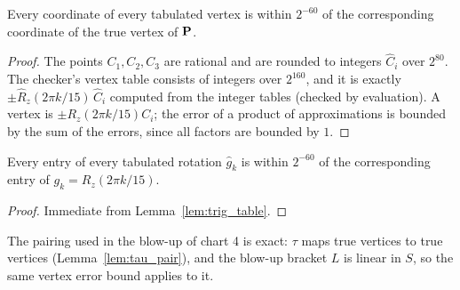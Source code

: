 \begin{lemma}
\label{lem:vertex_approx}
\leanok
{}
Every coordinate of every tabulated vertex is within $2^{-60}$ of the corresponding
coordinate of the true vertex of $\operatorname{\mathbf{P}}$.
\end{lemma}
\begin{proof}
\leanok
The points $C_1, C_2, C_3$ are rational and are rounded to integers $\hat C_i$ over $2^{80}$.
The checker's vertex table consists of integers over $2^{160}$, and it is exactly
$\pm \hat R_z(2\pi k/15)\, \hat C_i$ computed from the integer tables (checked by
evaluation). A vertex is $\pm R_z(2\pi k/15) C_i$; the error of a product of approximations
is bounded by the sum of the errors, since all factors are bounded by $1$.
\end{proof}

\begin{lemma}
\label{lem:group_approx}
\leanok
{}
Every entry of every tabulated rotation $\hat g_k$ is within $2^{-60}$ of the
corresponding entry of $g_k = R_z(2\pi k/15)$.
\end{lemma}
\begin{proof}
\leanok
Immediate from Lemma~\ref{lem:trig_table}.
\end{proof}

The pairing used in the blow-up of chart 4 is exact: $\tau$ maps true vertices to true
vertices (Lemma~\ref{lem:tau_pair}), and the blow-up bracket $L$ is linear in $S$, so the
same vertex error bound applies to it.
